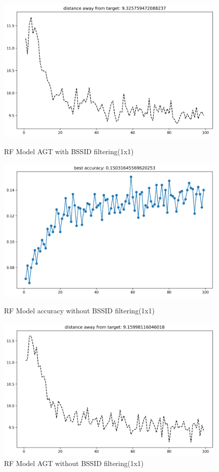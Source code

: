 \documentclass[conference]{IEEEtran}
\begin{document}
\begin{figure}[hbt!]
\begin{minipage}{0.45\textwidth}
			\includegraphics[width=\linewidth]{image6.png}
			\caption{RF Model AGT with BSSID filtering(1x1)}
		\end{minipage}
		\hfill
		\begin{minipage}{0.45\textwidth}
			\centering
			\includegraphics[width=\linewidth]{image4.png}
			\caption{RF Model accuracy without BSSID filtering(1x1)}
			
			\includegraphics[width=\linewidth]{image7.png}
			\caption{RF Model AGT without BSSID filtering(1x1)}
		\end{minipage}
	\end{figure}
	
\end{document}
